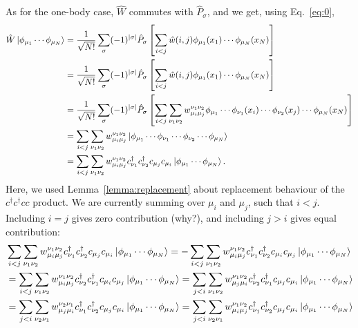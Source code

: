 \documentclass{report}
\theoremstyle{plain}
\theoremstyle{definition}
\begin{document}
As for the one-body case, $\hat{W}$ commutes with $\hat{P}_\sigma$,
and we get, using Eq.~\eqref{eq:0},
\begin{equation}
  \begin{split}
    \hat{W}\ket{\phi_{\mu_1}\cdots\phi_{\mu_N}} &= \frac{1}{\sqrt{N!}}
    \sum_\sigma (-1)^{|\sigma|} \hat{P}_\sigma \left[\sum_{i<j}
      \hat{w}(i,j)\phi_{\mu_1}(x_1)\cdots\phi_{\mu_N}(x_N) \right] \\ 
    & = \frac{1}{\sqrt{N!}}
    \sum_\sigma (-1)^{|\sigma|} \hat{P}_\sigma \left[\sum_{i<j}
      \hat{w}(i,j)\phi_{\mu_1}(x_1)\cdots\phi_{\mu_N}(x_N) \right] \\ 
    &=\frac{1}{\sqrt{N!}} \sum_\sigma (-1)^{|\sigma|} \hat{P}_\sigma
    \left[ \sum_{i<j} \sum_{\nu_1\nu_2} w^{\nu_1\nu_2}_{\mu_i\mu_j}
      \phi_{\mu_1} \cdots \phi_{\nu_1}(x_i) \cdots \phi_{\nu_2}(x_j)
      \cdots \phi_{\mu_N}(x_N) \right] \\
    & = \sum_{i<j} \sum_{\nu_1\nu_2}
    w^{\nu_1\nu_2}_{\mu_i\mu_j}
    \ket{\phi_{\mu_1}\cdots\phi_{\nu_1}\cdots\phi_{\nu_2}\cdots
      \phi_{\mu_N}} \\
    & = \sum_{i<j} \sum_{\nu_1\nu_2}
    w^{\nu_1\nu_2}_{\mu_i\mu_j}
    c^\dag_{\nu_1}c^\dag_{\nu_2}
    c_{\mu_j}c_{\mu_i}\ket{\phi_{\mu_1}\cdots\phi_{\mu_N}}.
  \end{split}
\end{equation}
Here, we used Lemma~\ref{lemma:replacement} about replacement behaviour of the $c^\dag
c^\dag c c$ product. We are currently summing over $\mu_i$ and
$\mu_j$, such that $i<j$. Including $i=j$ gives zero contribution
(why?), and including $j>i$ gives equal contribution:
\begin{equation}
  \begin{split}
    &\sum_{i<j} \sum_{\nu_1\nu_2}
    w^{\nu_1\nu_2}_{\mu_i\mu_j}
    c^\dag_{\nu_1}c^\dag_{\nu_2}
    c_{\mu_j}c_{\mu_i}\ket{\phi_{\mu_1}\cdots\phi_{\mu_N}} = 
    -\sum_{i<j} \sum_{\nu_1\nu_2}
    w^{\nu_1\nu_2}_{\mu_i\mu_j}
    c^\dag_{\nu_1}c^\dag_{\nu_2}
    c_{\mu_i}c_{\mu_j}\ket{\phi_{\mu_1}\cdots\phi_{\mu_N}} \\
    &=  \sum_{i<j} \sum_{\nu_1\nu_2}
    w^{\nu_1\nu_2}_{\mu_i\mu_j}
    c^\dag_{\nu_2}c^\dag_{\nu_1}
    c_{\mu_i}c_{\mu_j}\ket{\phi_{\mu_1}\cdots\phi_{\mu_N}} 
    =  \sum_{j<i} \sum_{\nu_1\nu_2}
    w^{\nu_1\nu_2}_{\mu_j\mu_i}
    c^\dag_{\nu_2}c^\dag_{\nu_1}
    c_{\mu_j}c_{\mu_i}\ket{\phi_{\mu_1}\cdots\phi_{\mu_N}} \\
    &=  \sum_{j<i} \sum_{\nu_2\nu_1}
    w^{\nu_2\nu_1}_{\mu_j\mu_i}
    c^\dag_{\nu_1}c^\dag_{\nu_2}
    c_{\mu_j}c_{\mu_i}\ket{\phi_{\mu_1}\cdots\phi_{\mu_N}} 
    =  \sum_{j<i} \sum_{\nu_2\nu_1}
    w^{\nu_1\nu_2}_{\mu_i\mu_j}
    c^\dag_{\nu_1}c^\dag_{\nu_2}
    c_{\mu_j}c_{\mu_i}\ket{\phi_{\mu_1}\cdots\phi_{\mu_N}} 
  \end{split}
\end{equation}
\end{document}
